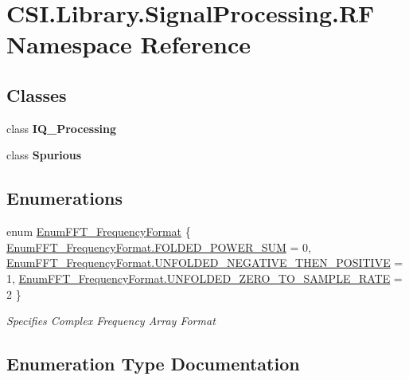 \hypertarget{namespace_c_s_i_1_1_library_1_1_signal_processing_1_1_r_f}{}\section{C\+S\+I.\+Library.\+Signal\+Processing.\+RF Namespace Reference}
\label{namespace_c_s_i_1_1_library_1_1_signal_processing_1_1_r_f}
\subsection*{Classes}
\begin{DoxyCompactItemize}
\item 
class {\bfseries I\+Q\+\_\+\+Processing}
\item 
class {\bfseries Spurious}
\end{DoxyCompactItemize}
\subsection*{Enumerations}
\begin{DoxyCompactItemize}
\item 
enum \mbox{\hyperlink{namespace_c_s_i_1_1_library_1_1_signal_processing_1_1_r_f_a6fb0758cf71ddc7c43ceacbe59de3411}{Enum\+F\+F\+T\+\_\+\+Frequency\+Format}} \{ \mbox{\hyperlink{namespace_c_s_i_1_1_library_1_1_signal_processing_1_1_r_f_a6fb0758cf71ddc7c43ceacbe59de3411ab93ba82ba3f166ed3f8d3c8805d04242}{Enum\+F\+F\+T\+\_\+\+Frequency\+Format.\+F\+O\+L\+D\+E\+D\+\_\+\+P\+O\+W\+E\+R\+\_\+\+S\+UM}} = 0, 
\mbox{\hyperlink{namespace_c_s_i_1_1_library_1_1_signal_processing_1_1_r_f_a6fb0758cf71ddc7c43ceacbe59de3411a23a51530bea36f6e673bbf2a519fc067}{Enum\+F\+F\+T\+\_\+\+Frequency\+Format.\+U\+N\+F\+O\+L\+D\+E\+D\+\_\+\+N\+E\+G\+A\+T\+I\+V\+E\+\_\+\+T\+H\+E\+N\+\_\+\+P\+O\+S\+I\+T\+I\+VE}} = 1, 
\mbox{\hyperlink{namespace_c_s_i_1_1_library_1_1_signal_processing_1_1_r_f_a6fb0758cf71ddc7c43ceacbe59de3411a0132c6c7881836b9b81de3c2c3d628d7}{Enum\+F\+F\+T\+\_\+\+Frequency\+Format.\+U\+N\+F\+O\+L\+D\+E\+D\+\_\+\+Z\+E\+R\+O\+\_\+\+T\+O\+\_\+\+S\+A\+M\+P\+L\+E\+\_\+\+R\+A\+TE}} = 2
 \}
\begin{DoxyCompactList}\small\item\em Specifies Complex Frequency Array Format \end{DoxyCompactList}\end{DoxyCompactItemize}


\subsection{Enumeration Type Documentation}
\mbox{\label{namespace_c_s_i_1_1_library_1_1_signal_processing_1_1_r_f_a6fb0758cf71ddc7c43ceacbe59de3411}} 
